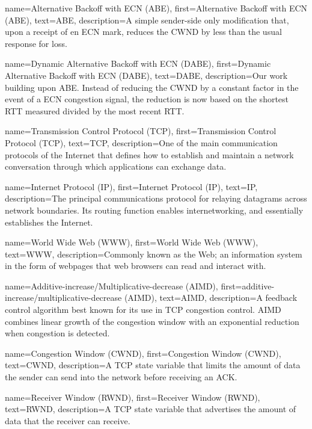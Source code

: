 {
    name={Alternative Backoff with ECN (ABE)},
    first={Alternative Backoff with ECN (ABE)},
    text={ABE},
    description={A simple sender-side only modification that, upon a receipt of en ECN mark, reduces the CWND by less than the usual response for loss.}
}

{
    name={Dynamic Alternative Backoff with ECN (DABE)},
    first={Dynamic Alternative Backoff with ECN (DABE)},
    text={DABE},
    description={Our work building upon ABE. Instead of reducing the CWND by a constant factor in the event of a ECN congestion signal, the reduction is now based on the shortest RTT measured divided by the most recent RTT.}
}

{
    name={Transmission Control Protocol (TCP)},
    first={Transmission Control Protocol (TCP)},
    text={TCP},
    description={One of the main communication protocols of the Internet that defines how to establish and maintain a network conversation through which applications can exchange data.}
}

{
    name={Internet Protocol (IP)},
    first={Internet Protocol (IP)},
    text={IP},
    description={The principal communications protocol for relaying datagrams across network boundaries. Its routing function enables internetworking, and essentially establishes the Internet.}
}

{
    name={World Wide Web (WWW)},
    first={World Wide Web (WWW)},
    text={WWW},
    description={Commonly known as the Web; an information system in the form of webpages that web browsers can read and interact with.}
}

{
    name={Additive-increase/Multiplicative-decrease (AIMD)},
    first={additive-increase/multiplicative-decrease (AIMD)},
    text={AIMD},
    description={A feedback control algorithm best known for its use in TCP congestion control. AIMD combines linear growth of the congestion window with an exponential reduction when congestion is detected.}
}

{
    name={Congestion Window (CWND)},
    first={Congestion Window (CWND)},
    text={CWND},
    description={A TCP state variable that limits the amount of data the sender can send into the network before receiving an ACK.}
}

{
    name={Receiver Window (RWND)},
    first={Receiver Window (RWND)},
    text={RWND},
    description={A TCP state variable that advertises the amount of data that the receiver can receive.}
}


